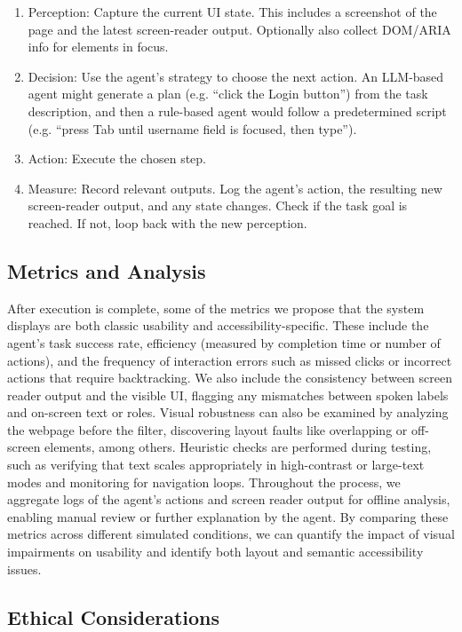 \begin{enumerate}
    \item Perception: Capture the current UI state. This includes a screenshot of the page and the latest screen-reader output. Optionally also collect DOM/ARIA info for elements in focus. 
    \item Decision: Use the agent's strategy to choose the next action. An LLM-based agent might generate a plan (e.g. “click the Login button”) from the task description, and then a rule-based agent would follow a predetermined script (e.g. “press Tab until username field is focused, then type”).
    \item Action: Execute the chosen step.
    \item Measure: Record relevant outputs. Log the agent's action, the resulting new screen-reader output, and any state changes. Check if the task goal is reached. If not, loop back with the new perception.
\end{enumerate}



\subsection{Metrics and Analysis}

After execution is complete, some of the metrics we propose that the system displays are both classic usability and accessibility-specific. These include the agent's task success rate, efficiency (measured by completion time or number of actions), and the frequency of interaction errors such as missed clicks or incorrect actions that require backtracking. We also include the consistency between screen reader output and the visible UI, flagging any mismatches between spoken labels and on-screen text or roles. Visual robustness can also be examined by analyzing the webpage before the filter, discovering layout faults like overlapping or off-screen elements, among others. Heuristic checks are performed during testing, such as verifying that text scales appropriately in high-contrast or large-text modes and monitoring for navigation loops. Throughout the process, we aggregate logs of the agent's actions and screen reader output for offline analysis, enabling manual review or further explanation by the agent. By comparing these metrics across different simulated conditions, we can quantify the impact of visual impairments on usability and identify both layout and semantic accessibility issues.

\subsection{Ethical Considerations}

